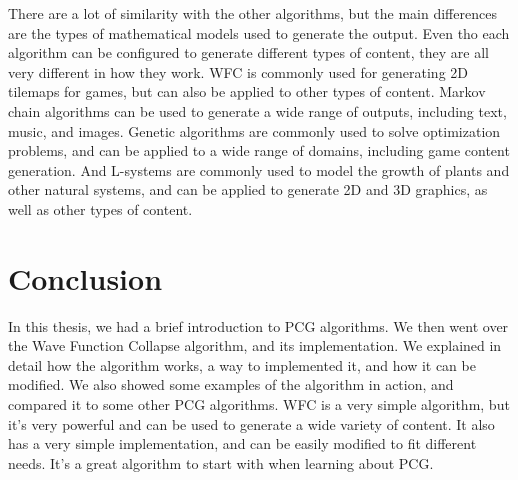 \documentclass[10pt,oneside,a4paper]{article}
\begin{document}
There are a lot of similarity with the other algorithms, but the main differences are the types of mathematical models used to generate the output.
Even tho each algorithm can be configured to generate different types of content, they are all very different in how they work.
WFC is commonly used for generating 2D tilemaps for games, but can also be applied to other types of content.
Markov chain algorithms can be used to generate a wide range of outputs, including text, music, and images.
Genetic algorithms are commonly used to solve optimization problems, and can be applied to a wide range of domains, including game content generation.
And L-systems are commonly used to model the growth of plants and other natural systems, and can be applied to generate 2D and 3D graphics, as well as other types of content.

\section{Conclusion}\label{sec:conclusion}
In this thesis, we had a brief introduction to PCG algorithms.
We then went over the Wave Function Collapse algorithm, and its implementation.
We explained in detail how the algorithm works, a way to implemented it, and how it can be modified.
We also showed some examples of the algorithm in action, and compared it to some other PCG algorithms.
WFC is a very simple algorithm, but it's very powerful and can be used to generate a wide variety of content.
It also has a very simple implementation, and can be easily modified to fit different needs.
It's a great algorithm to start with when learning about PCG\@.



\end{document}
